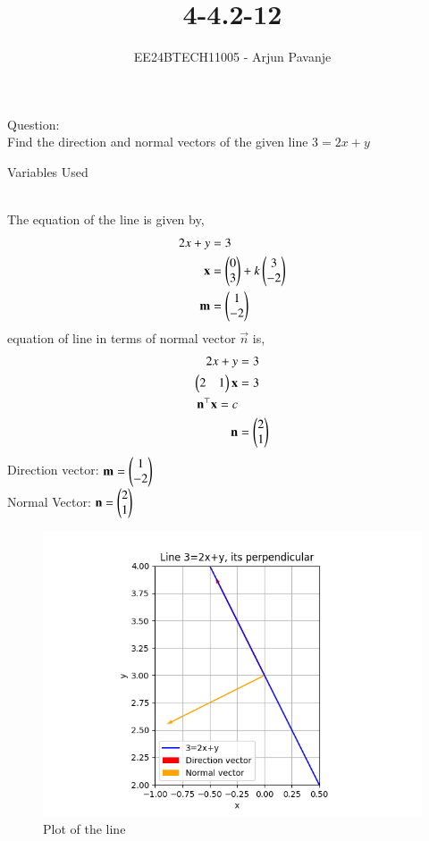 \documentclass[journal]{IEEEtran}
\begin{document}

\vspace{3cm}

\title{4-4.2-12}
\author{EE24BTECH11005 - Arjun Pavanje}
{\let\newpage\relax\maketitle}
Question:\\
Find the direction and normal vectors of the given line $3=2x+y$
\begin{table}[h!]    
  \centering
  
  \caption{Variables Used}
  \label{tab1-1.9-6}
\end{table}\\
\solution
The equation of the line is given by,
\begin{align}
2x+y&=3\\
	\mathbf{x}&=\begin{pmatrix}0\\3\end{pmatrix}+k\begin{pmatrix}3\\-2\end{pmatrix}\\
	\mathbf{m}&=\begin{pmatrix}1\\-2\end{pmatrix}
\end{align}
equation of line in terms of normal vector $\vec{n}$ is,
\begin{align}
	2x+y&=3\\
	\begin{pmatrix}2 & 1\end{pmatrix}\mathbf{x}&=3\\
\mathbf{n}^\top\mathbf{x}=c\\
	\mathbf{n}&=\begin{pmatrix}2\\1\end{pmatrix}
\end{align}
Direction vector: $\mathbf{m}=\begin{pmatrix}1\\-2\end{pmatrix}$\\
Normal Vector: $\mathbf{n}=\begin{pmatrix}2\\1\end{pmatrix}$
\begin{figure}[h!]
   \centering
   \includegraphics[width = 1\linewidth]{figs/fig.png}
   \caption{Plot of the line}
   \label{stemplot}
\end{figure}
\end{document}
